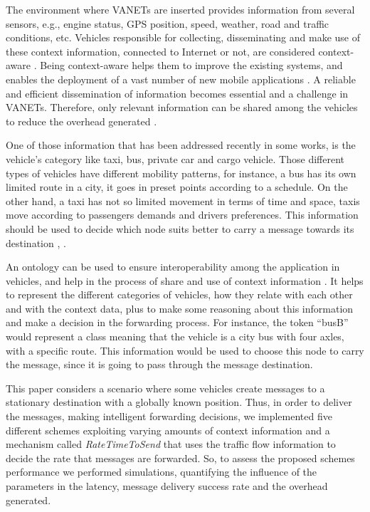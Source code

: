 \documentclass[conference]{IEEEtran}
\begin{document}
The environment where VANETs are inserted provides information from several sensors, e.g., engine status, GPS position, speed, weather, road and traffic conditions, etc. Vehicles responsible for collecting, disseminating and make use of these context information, connected to Internet or not, are considered context-aware \cite{grilli2009}. Being context-aware helps them to improve the existing systems, and enables the deployment of a vast number of new mobile applications \cite{contory2006}. A reliable and efficient dissemination of information becomes essential and a challenge in VANETs. Therefore, only relevant information can be shared among the vehicles to reduce the overhead generated \cite{kumar2015}. 

One of those information that has been addressed recently in some works, is the vehicle's category like taxi, bus, private car and cargo vehicle. Those different types of vehicles have different mobility patterns, for instance, a bus has its own limited route in a city, it goes in preset points according to a schedule. On the other hand, a taxi has not so limited movement in terms of time and space, taxis move according to  passengers demands and drivers preferences. This information should be used to decide which node suits better to carry a message towards its destination \cite{zhang2012}, \cite{zhang2014}.

An ontology can be used to ensure interoperability among the application in vehicles, and help in the process of share and use of context information \cite{madkour2011}. It helps to represent the different categories of vehicles, how they relate with each other and with the context data, plus to make some reasoning about this information and make a decision in the forwarding process. For instance, the token “busB” would represent a class meaning that the vehicle is a city bus with four axles, with a specific route. This information would be used to choose this node to carry the message, since it is going to pass through the message destination.

This paper considers a scenario where some vehicles create messages to a stationary destination with a globally known position. Thus, in order to deliver the messages, making intelligent forwarding decisions, we implemented five different schemes exploiting varying amounts of context information and a mechanism called \emph{RateTimeToSend} that uses the traffic flow information to decide the rate that messages are forwarded. So, to assess the proposed schemes performance we performed simulations, quantifying the influence of the parameters in the latency, message delivery success rate and the overhead generated. 
\end{document}
